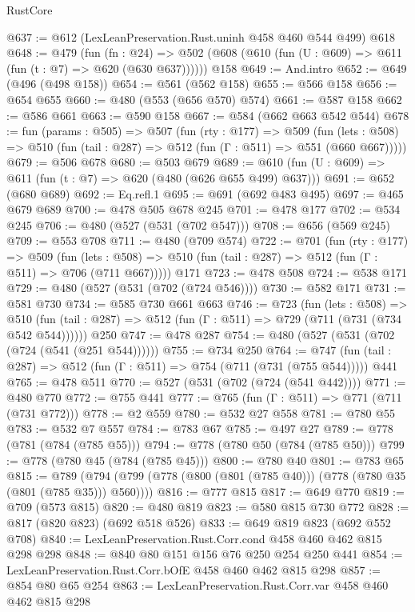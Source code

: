 \begin{lexlean}{RustCore}
\begin{coremodule}
@637 := @612 (LexLeanPreservation.Rust.uninh @458 @460 @544 @499) @618
@648 := @479
    (fun (fn : @24) =>
    @502 (@608 (@610 (fun (U : @609) => @611 (fun (t : @7) => @620 (@630 @637))))))
    @158
@649 := And.intro
@652 := @649 (@496 (@498 @158))
@654 := @561 (@562 @158)
@655 := @566 @158
@656 := @654 @655
@660 := @480 (@553 (@656 @570) @574)
@661 := @587 @158
@662 := @586 @661
@663 := @590 @158
@667 := @584 (@662 @663 @542 @544)
@678 := fun (params : @505) =>
  @507
    (fun (rty : @177) =>
    @509
      (fun (lets : @508) => @510 (fun (tail : @287) => @512 (fun (Γ : @511) => @551 (@660 @667)))))
@679 := @506 @678
@680 := @503 @679
@689 := @610 (fun (U : @609) => @611 (fun (t : @7) => @620 (@480 (@626 @655 @499) @637)))
@691 := @652 (@680 @689)
@692 := Eq.refl.{1}
@695 := @691 (@692 @483 @495)
@697 := @465 @679 @689
@700 := @478 @505 @678 @245
@701 := @478 @177
@702 := @534 @245
@706 := @480 (@527 (@531 (@702 @547)))
@708 := @656 (@569 @245)
@709 := @553 @708
@711 := @480 (@709 @574)
@722 := @701
    (fun (rty : @177) =>
    @509
      (fun (lets : @508) => @510 (fun (tail : @287) => @512 (fun (Γ : @511) => @706 (@711 @667)))))
    @171
@723 := @478 @508
@724 := @538 @171
@729 := @480 (@527 (@531 (@702 (@724 @546))))
@730 := @582 @171
@731 := @581 @730
@734 := @585 @730 @661 @663
@746 := @723
    (fun (lets : @508) =>
    @510 (fun (tail : @287) => @512 (fun (Γ : @511) => @729 (@711 (@731 (@734 @542 @544))))))
    @250
@747 := @478 @287
@754 := @480 (@527 (@531 (@702 (@724 (@541 (@251 @544))))))
@755 := @734 @250
@764 := @747 (fun (tail : @287) => @512 (fun (Γ : @511) => @754 (@711 (@731 (@755 @544))))) @441
@765 := @478 @511
@770 := @527 (@531 (@702 (@724 (@541 @442))))
@771 := @480 @770
@772 := @755 @441
@777 := @765 (fun (Γ : @511) => @771 (@711 (@731 @772)))
@778 := @2 @559
@780 := @532 @27 @558
@781 := @780 @55
@783 := @532 @7 @557
@784 := @783 @67
@785 := @497 @27
@789 := @778 (@781 (@784 (@785 @55)))
@794 := @778 (@780 @50 (@784 (@785 @50)))
@799 := @778 (@780 @45 (@784 (@785 @45)))
@800 := @780 @40
@801 := @783 @65
@815 := @789 (@794 (@799 (@778 (@800 (@801 (@785 @40))) (@778 (@780 @35 (@801 (@785 @35))) @560))))
@816 := @777 @815
@817 := @649 @770
@819 := @709 (@573 @815)
@820 := @480 @819
@823 := @580 @815 @730 @772
@828 := @817 (@820 @823) (@692 @518 @526)
@833 := @649 @819 @823 (@692 @552 @708)
@840 := LexLeanPreservation.Rust.Corr.cond @458 @460 @462 @815 @298 @298
@848 := @840 @80 @151 @156 @76 @250 @254 @250 @441
@854 := LexLeanPreservation.Rust.Corr.bOfE @458 @460 @462 @815 @298
@857 := @854 @80 @65 @254
@863 := LexLeanPreservation.Rust.Corr.var @458 @460 @462 @815 @298

\end{coremodule}
\end{lexlean}
